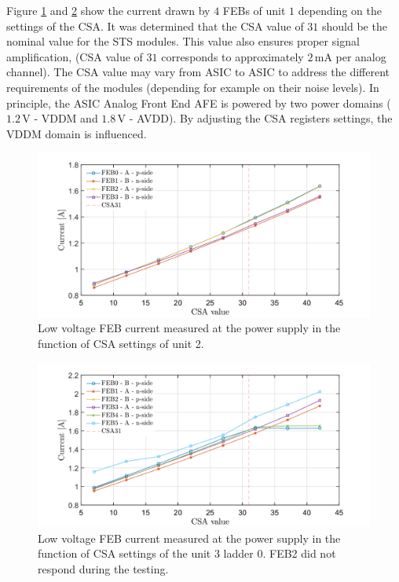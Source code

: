 \newpage
Figure \ref{fig_power3} and \ref{fig_power4} show the current drawn by $4$ \glspl{FEB} of unit $1$ depending on the settings of the \gls{CSA}. It was determined that the \gls{CSA} value of $31$ should be the nominal value for the \gls{STS} modules. This value also ensures proper signal amplification, (\gls{CSA} value of $31$ corresponds to approximately $2$\,mA per analog channel). The \gls{CSA} value may vary from \gls{ASIC} to \gls{ASIC} to address the different requirements of the modules (depending for example on their noise levels). In principle, the \gls{ASIC} Analog Front End \gls{AFE} is powered by two power domains ($1.2$\,V - VDDM and $1.8$\,V - AVDD). By adjusting the \gls{CSA} registers settings, the VDDM domain is influenced. 
\begin{figure}[h!]
\centering
\includegraphics[width=0.9\columnwidth]{Chapter6/DCS/images/U0CSABIAS.png}
\caption{Low voltage \gls{FEB} current measured at the power supply in the function of CSA settings of unit 2. }
\label{fig_power3}
\end{figure}
\begin{figure}[h!]
\centering
\includegraphics[width=0.9\columnwidth]{Chapter6/DCS/images/U3L0CSABIAS.png}
\caption{Low voltage \gls{FEB} current measured at the power supply in the function of CSA settings of the unit 3 ladder 0. FEB2 did not respond during the testing.}
\label{fig_power4}
\end{figure}

